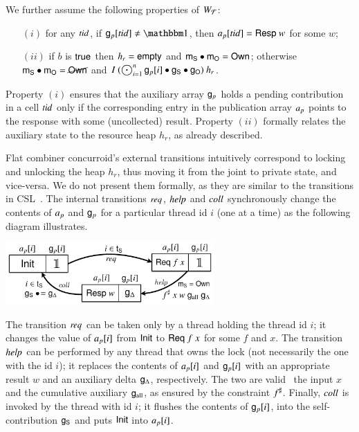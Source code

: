 We further assume the following properties of $W_{\mathcal{F}}$:
%
\begin{itemize}
\item [$(i)$] for any $\mathit{tid}$, if $\gp[\tid] \neq \pcmU$, then $\text{\emph{a}}_p[\mathit{tid}] =
  \mathsf{Resp}\ {w}$ for some $w$;
\item [$(ii)$] if $b$ is $\mathsf{true}$ then $h_r = \mathsf{empty}$ and $\mathsf{m}_{{\mathsf{S}}} \bullet
  \mathsf{m}_{{\mathsf{O}}} = \mathsf{Own}$; otherwise $\mathsf{m}_{{\mathsf{S}}} \bullet \mathsf{m}_{{\mathsf{O}}} = \cancel{\mathsf{Own}}$ and
  $I~(\bigodot_{i=1}^n\mathsf{g}_{p}[i] \bullet \mathsf{g}_{{\mathsf{S}}} \bullet \mathsf{g}_{{\mathsf{O}}} )~h_r$.
\end{itemize}
%
Property $(i)$ ensures that the auxiliary array $\mathsf{g}_{p}$ holds a pending
contribution in a cell $\mathit{tid}$ only if the corresponding entry in the
publication array $\text{\emph{a}}_p$ points to the response with some (uncollected)
result.
%
Property $(ii)$ formally relates the auxiliary state to the resource
heap $h_r$, as already described.

Flat combiner concurroid's external transitions intuitively correspond
to locking and unlocking the heap $h_r$, thus moving it from the joint
to private state, and vice-versa. We do not present them formally, as
they are similar to the transitions in CSL~\cite{Nanevski-al:ESOP14}.
%
The internal transitions $\text{\emph{req}}$, $\text{\emph{help}}$ and $\text{\emph{coll}}$
synchronously change the contents of $\text{\emph{a}}_p$ and $\mathsf{g}_{p}$ for a particular
thread id $i$ (one at a time) as the following diagram illustrates.
%
%
\begin{center}
\includegraphics[width=0.60\textwidth]{fctrans.pdf}    
\end{center}
%
%
The transition $\text{\emph{req}}$ can be taken only by a thread holding the
thread id $i$; it changes the value of $\text{\emph{a}}_p[i]$ from $\mathsf{Init}$ to
$\mathsf{Req}\ {f}~{x}$ for some $f$ and $x$.
%
The transition $\text{\emph{help}}$ can be performed by any thread that owns
the lock (not necessarily the one with the id $i$); it replaces the
contents of $\text{\emph{a}}_p[i]$ and $\mathsf{g}_{p}[i]$ with an appropriate result $w$ and
an auxiliary delta $\mathsf{g}_{\Delta}$, respectively. The two are valid \wrt~the
input $x$ and the cumulative auxiliary $\mathsf{g}_{\text{all}}$, as ensured by the
constraint ${f}^{\sharp}$.
%
Finally, $\text{\emph{coll}}$ is invoked by the thread with id $i$; it flushes
the contents of $\mathsf{g}_{p}[i]$, into the self-contribution $\mathsf{g}_{\mathsf{S}}$ and puts
$\mathsf{Init}$ into $\text{\emph{a}}_p[i]$.

